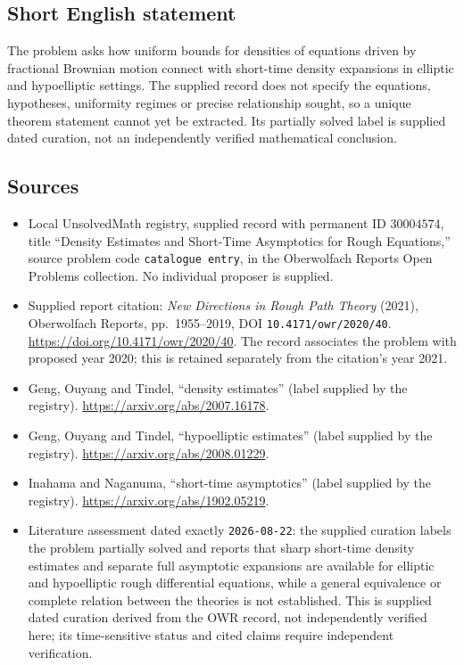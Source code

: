 \documentclass[11pt]{article}
\begin{document}
\subsection{Short English statement}
The problem asks how uniform bounds for densities of equations driven by fractional Brownian motion connect with short-time density expansions in elliptic and hypoelliptic settings. The supplied record does not specify the equations, hypotheses, uniformity regimes or precise relationship sought, so a unique theorem statement cannot yet be extracted. Its partially solved label is supplied dated curation, not an independently verified mathematical conclusion.
\subsection{Sources}
\begin{itemize}
\item Local UnsolvedMath registry, supplied record with permanent ID \(30004574\), title ``Density Estimates and Short-Time Asymptotics for Rough Equations,'' source problem code \texttt{catalogue entry}, in the Oberwolfach Reports Open Problems collection. No individual proposer is supplied.
\item Supplied report citation: \emph{New Directions in Rough Path Theory} (2021), Oberwolfach Reports, pp.\ 1955--2019, DOI \texttt{10.4171/owr/2020/40}. \url{https://doi.org/10.4171/owr/2020/40}. The record associates the problem with proposed year 2020; this is retained separately from the citation's year 2021.
\item Geng, Ouyang and Tindel, ``density estimates'' (label supplied by the registry). \url{https://arxiv.org/abs/2007.16178}.
\item Geng, Ouyang and Tindel, ``hypoelliptic estimates'' (label supplied by the registry). \url{https://arxiv.org/abs/2008.01229}.
\item Inahama and Naganuma, ``short-time asymptotics'' (label supplied by the registry). \url{https://arxiv.org/abs/1902.05219}.
\item Literature assessment dated exactly \texttt{2026-08-22}: the supplied curation labels the problem partially solved and reports that sharp short-time density estimates and separate full asymptotic expansions are available for elliptic and hypoelliptic rough differential equations, while a general equivalence or complete relation between the theories is not established. This is supplied dated curation derived from the OWR record, not independently verified here; its time-sensitive status and cited claims require independent verification.
\end{itemize}
\end{document}
